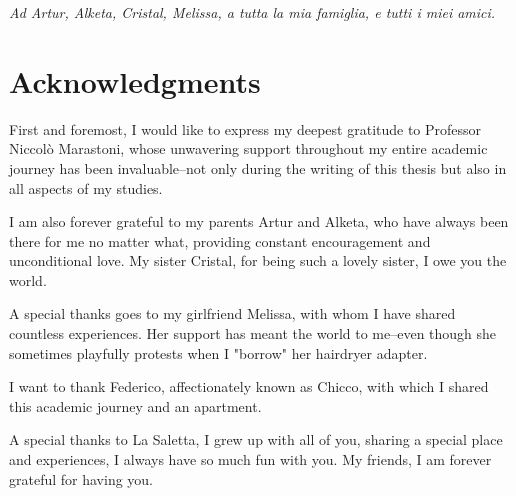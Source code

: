 
\begin{titlepage}
    \pagestyle{empty}
    \makefrontpage
    \restoregeometry
\end{titlepage}

\newpage
\thispagestyle{empty}
\mbox{}  %
\newpage


\frontmatter
\null{}
\begin{flushright}
    \textit{Ad Artur, Alketa, Cristal, Melissa, a tutta la mia famiglia, e tutti i miei amici.}

\end{flushright}
\null

\chapter*{Acknowledgments}
First and foremost, I would like to express my deepest gratitude to Professor Niccolò Marastoni, whose unwavering support throughout my entire academic journey has been invaluable--not only during the writing of this thesis but also in all aspects of my studies.

I am also forever grateful to my parents Artur and Alketa, who have always been there for me no matter what, providing constant encouragement and unconditional love. My sister Cristal, for being such a lovely sister, I owe you the world.

A special thanks goes to my girlfriend Melissa, with whom I have shared countless experiences. Her support has meant the world to me--even though she sometimes playfully protests when I "borrow" her hairdryer adapter.

I want to thank Federico, affectionately known as Chicco, with which I shared this academic journey and an apartment.

A special thanks to La Saletta, I grew up with all of you, sharing a special place and experiences, I always have so much fun with you. My friends, I am forever grateful for having you.

